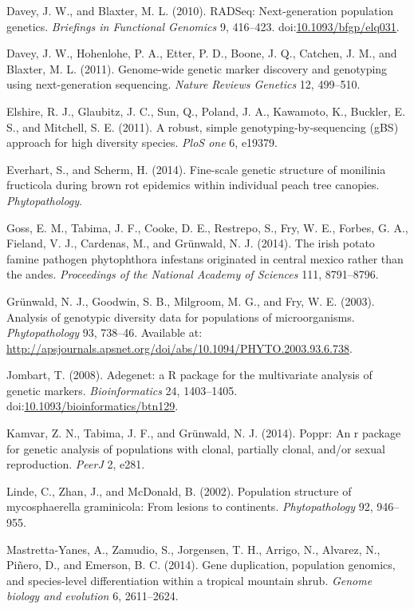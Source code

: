 \documentclass{frontiersSCNS} %
\begin{document}
Davey, J. W., and Blaxter, M. L. (2010). RADSeq: Next-generation
population genetics. \emph{Briefings in Functional Genomics} 9,
416--423.
doi:\href{http://dx.doi.org/10.1093/bfgp/elq031}{10.1093/bfgp/elq031}.

Davey, J. W., Hohenlohe, P. A., Etter, P. D., Boone, J. Q., Catchen, J.
M., and Blaxter, M. L. (2011). Genome-wide genetic marker discovery and
genotyping using next-generation sequencing. \emph{Nature Reviews
Genetics} 12, 499--510.

Elshire, R. J., Glaubitz, J. C., Sun, Q., Poland, J. A., Kawamoto, K.,
Buckler, E. S., and Mitchell, S. E. (2011). A robust, simple
genotyping-by-sequencing (gBS) approach for high diversity species.
\emph{PloS one} 6, e19379.

Everhart, S., and Scherm, H. (2014). Fine-scale genetic structure of
monilinia fructicola during brown rot epidemics within individual peach
tree canopies. \emph{Phytopathology}.

Goss, E. M., Tabima, J. F., Cooke, D. E., Restrepo, S., Fry, W. E.,
Forbes, G. A., Fieland, V. J., Cardenas, M., and Gr{ü}nwald, N. J.
(2014). The irish potato famine pathogen phytophthora infestans
originated in central mexico rather than the andes. \emph{Proceedings of
the National Academy of Sciences} 111, 8791--8796.

Grünwald, N. J., Goodwin, S. B., Milgroom, M. G., and Fry, W. E. (2003).
Analysis of genotypic diversity data for populations of microorganisms.
\emph{Phytopathology} 93, 738--46. Available at:
\url{http://apsjournals.apsnet.org/doi/abs/10.1094/PHYTO.2003.93.6.738}.

Jombart, T. (2008). Adegenet: a R package for the multivariate analysis
of genetic markers. \emph{Bioinformatics} 24, 1403--1405.
doi:\href{http://dx.doi.org/10.1093/bioinformatics/btn129}{10.1093/bioinformatics/btn129}.

Kamvar, Z. N., Tabima, J. F., and Gr{ü}nwald, N. J. (2014). Poppr: An r
package for genetic analysis of populations with clonal, partially
clonal, and/or sexual reproduction. \emph{PeerJ} 2, e281.

Linde, C., Zhan, J., and McDonald, B. (2002). Population structure of
mycosphaerella graminicola: From lesions to continents.
\emph{Phytopathology} 92, 946--955.

Mastretta-Yanes, A., Zamudio, S., Jorgensen, T. H., Arrigo, N., Alvarez,
N., Pi{ñ}ero, D., and Emerson, B. C. (2014). Gene duplication,
population genomics, and species-level differentiation within a tropical
mountain shrub. \emph{Genome biology and evolution} 6, 2611--2624.
\end{document}
